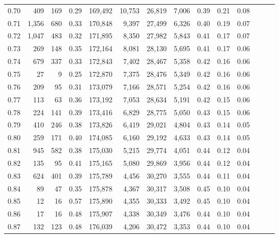 \begin{tabular}{rrrrrrrrrrrrrr}
0.70 &     409 &    169 &  0.29 &  169,492 &   10,753 &  26,819 &   7,006 &  0.39 &  0.21 &      0.08 \\
0.71 &   1,356 &    680 &  0.33 &  170,848 &    9,397 &  27,499 &   6,326 &  0.40 &  0.19 &      0.07 \\
0.72 &   1,047 &    483 &  0.32 &  171,895 &    8,350 &  27,982 &   5,843 &  0.41 &  0.17 &      0.07 \\
0.73 &     269 &    148 &  0.35 &  172,164 &    8,081 &  28,130 &   5,695 &  0.41 &  0.17 &      0.06 \\
0.74 &     679 &    337 &  0.33 &  172,843 &    7,402 &  28,467 &   5,358 &  0.42 &  0.16 &      0.06 \\
0.75 &      27 &      9 &  0.25 &  172,870 &    7,375 &  28,476 &   5,349 &  0.42 &  0.16 &      0.06 \\
0.76 &     209 &     95 &  0.31 &  173,079 &    7,166 &  28,571 &   5,254 &  0.42 &  0.16 &      0.06 \\
0.77 &     113 &     63 &  0.36 &  173,192 &    7,053 &  28,634 &   5,191 &  0.42 &  0.15 &      0.06 \\
0.78 &     224 &    141 &  0.39 &  173,416 &    6,829 &  28,775 &   5,050 &  0.43 &  0.15 &      0.06 \\
0.79 &     410 &    246 &  0.38 &  173,826 &    6,419 &  29,021 &   4,804 &  0.43 &  0.14 &      0.05 \\
0.80 &     259 &    171 &  0.40 &  174,085 &    6,160 &  29,192 &   4,633 &  0.43 &  0.14 &      0.05 \\
0.81 &     945 &    582 &  0.38 &  175,030 &    5,215 &  29,774 &   4,051 &  0.44 &  0.12 &      0.04 \\
0.82 &     135 &     95 &  0.41 &  175,165 &    5,080 &  29,869 &   3,956 &  0.44 &  0.12 &      0.04 \\
0.83 &     624 &    401 &  0.39 &  175,789 &    4,456 &  30,270 &   3,555 &  0.44 &  0.11 &      0.04 \\
0.84 &      89 &     47 &  0.35 &  175,878 &    4,367 &  30,317 &   3,508 &  0.45 &  0.10 &      0.04 \\
0.85 &      12 &     16 &  0.57 &  175,890 &    4,355 &  30,333 &   3,492 &  0.45 &  0.10 &      0.04 \\
0.86 &      17 &     16 &  0.48 &  175,907 &    4,338 &  30,349 &   3,476 &  0.44 &  0.10 &      0.04 \\
0.87 &     132 &    123 &  0.48 &  176,039 &    4,206 &  30,472 &   3,353 &  0.44 &  0.10 &      0.04 \\

\end{tabular}
